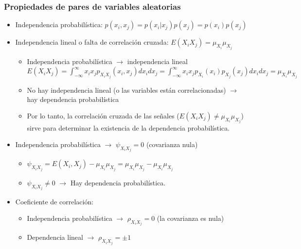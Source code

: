 \documentclass{beamer}
\numberwithin{section}{part}
\begin{document}
\begin{frame}
\frametitle{Propiedades de pares de variables aleatorias}
  \footnotesize
  \begin{itemize}
    \item Independencia probabilística:
      $p(x_i,x_j)=p(x_i|x_j)p(x_j)=p(x_i)p(x_j)$

    \item Independencia lineal o falta de correlación cruzada:  $E(X_i X_j)=\mu_{X_i}\mu_{X_j}$

    \begin{itemize}
      \footnotesize
      \item Independencia probabilística $\rightarrow$ independencia lineal
      \vspace{0.1cm}
      $E(X_i X_j)\!=\!\! \int_{-\infty}^{\infty}\!\! x_i x_j p_{X_iX_j}(x_i,x_j)dx_i dx_j\!=\!\!\! \int_{-\infty}^{\infty}\!\! x_i x_j p_{X_i}(x_i)p_{X_j}(x_j)dx_i dx_j\!=\!\mu_{X_i}\mu_{X_j}$

      \item No hay independencia lineal (o las variables están correlacionadas) $\rightarrow$ hay dependencia probabilística

      \vspace{0.1cm}
      \item Por lo tanto, la correlación cruzada de las señales ($E(X_i X_j)\neq \mu_{X_i}\mu_{X_j}$) sirve para determinar la existencia de la dependencia probabilística.
    \end{itemize}
     \item Independencia probabilística $\rightarrow$ $\psi_{X_iX_j}=0$ (covarianza nula)
    
    \vspace{-0.1cm}
    
    \begin{itemize}
      \item $\psi_{X_iX_j}=E(X_i,X_j)-\mu_{X_i}\mu_{X_j}=\mu_{X_i}\mu_{X_j}-\mu_{X_i}\mu_{X_j}$
      \vspace{0.1cm}    
      \item  $\psi_{X_iX_j}\ne0$ $\rightarrow$ Hay dependencia probabilística.
    \end{itemize}
    \item Coeficiente de correlación:
    \begin{itemize}
      \footnotesize
      \item Independencia probabilística $\rightarrow$ $\rho_{X_iX_j}=0$ (la covarianza es nula)
      \item Dependencia lineal $\rightarrow$ $\rho_{X_iX_j}=\pm 1$
    \end{itemize}
  \end{itemize}

\end{frame}
\end{document}
